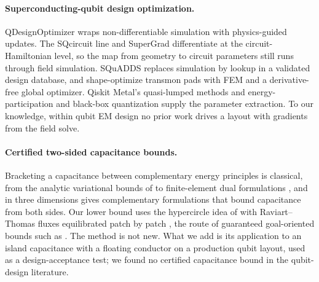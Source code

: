 \documentclass{anvil-paper}
\begin{document}
\paragraph{Superconducting-qubit design optimization.}
QDesignOptimizer \citep{eriksson2025automated} wraps
non-differentiable simulation with physics-guided updates. The SQcircuit
line \citep{rajabzadeh2023analysis,rajabzadeh2024general} and SuperGrad
\citep{wang2025supergrad} differentiate at the circuit-Hamiltonian level,
so the map from geometry to circuit parameters still runs through field
simulation. SQuADDS \citep{shanto2024squadds} replaces simulation by
lookup in a validated design database, and \citet{eun2023shape}
shape-optimize transmon pads with FEM and a derivative-free global
optimizer. Qiskit Metal's quasi-lumped methods \citep{minev2021circuit} and
energy-participation and black-box quantization
\citep{koch2007,nigg2012,minev2021} supply the parameter extraction. To our
knowledge, within qubit EM design no prior work drives a layout with
gradients from the field solve.

\paragraph{Certified two-sided capacitance bounds.}
Bracketing a capacitance between complementary energy principles is
classical, from the analytic variational bounds of
\citet{polya1951isoperimetric} to finite-element dual formulations
\citep{hammond1976calculation,penman1983dual}, and in three dimensions
\citet{specogna2011complementary} gives complementary formulations that
bound capacitance from both sides. Our lower bound uses the hypercircle
idea of \citet{prager1947approximations} with Raviart--Thomas fluxes
\citep{raviart1977mixed} equilibrated patch by patch
\citep{braess2007equilibrated,braess2009equilibrated,ern2015polynomial},
the route of guaranteed goal-oriented bounds such as
\citet{pares2021posteriori}. The method is not new. What we add is its
application to an island capacitance with a floating conductor on a
production qubit layout, used as a design-acceptance test; we found no
certified capacitance bound in the qubit-design literature.
\end{document}
